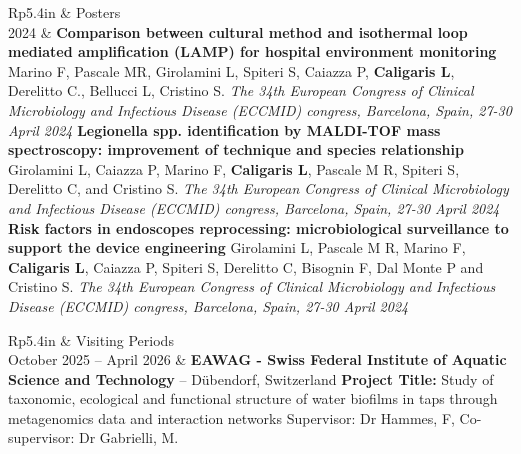 \documentclass[letterpaper, 11pt]{article}
\newcommand{\headingfont}{\Large\color{OliveGreen}}
\newenvironment{SectionTable}[1]{
	\renewcommand*{\arraystretch}{1.7}
	\setlength{\tabcolsep}{10pt}
	\begin{longtable}{Rp{5.4in}} & #1 \\}
{\end{longtable}\vspace{-.3cm}}
\begin{document}
\begin{SectionTable}{\headingfont Posters}
2024 &
\textbf{Comparison between cultural method and isothermal loop mediated amplification (LAMP) for hospital environment monitoring} \newline
Marino F, Pascale MR, Girolamini L, Spiteri S, Caiazza P, \textbf{Caligaris L}, Derelitto C., Bellucci L, Cristino S. \newline
\textit{The 34th European Congress of Clinical Microbiology and Infectious Disease (ECCMID) congress, Barcelona, Spain, 27-30 April 2024} \newline
\textbf{Legionella spp. identification by MALDI-TOF mass spectroscopy: improvement of technique and species relationship} \newline
Girolamini L, Caiazza P, Marino F, \textbf{Caligaris L}, Pascale M R, Spiteri S, Derelitto C, and Cristino S. \newline
\textit{The 34th European Congress of Clinical Microbiology and Infectious Disease (ECCMID) congress, Barcelona, Spain, 27-30 April 2024} \newline
\textbf{Risk factors in endoscopes reprocessing: microbiological surveillance to support the device engineering} \newline
Girolamini L, Pascale M R, Marino F, \textbf{Caligaris L}, Caiazza P, Spiteri S, Derelitto C, Bisognin F, Dal Monte P and Cristino S. \newline
\textit{The 34th European Congress of Clinical Microbiology and Infectious Disease (ECCMID) congress, Barcelona, Spain, 27-30 April 2024} \\

\end{SectionTable}


\begin{SectionTable}{\headingfont Visiting Periods}
October 2025 -- April 2026 &
\textbf{EAWAG - Swiss Federal Institute of Aquatic Science and Technology } -- Dübendorf, Switzerland \newline
\textbf{Project Title:} Study of taxonomic, ecological and functional structure of water biofilms in taps through metagenomics data and interaction networks \newline
Supervisor: Dr Hammes, F, Co-supervisor: Dr Gabrielli, M.
\end{SectionTable}

\end{document}
